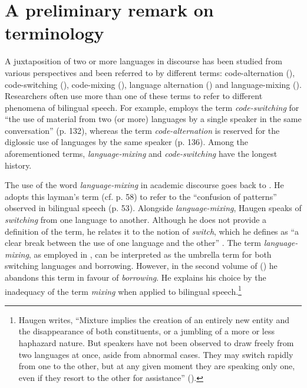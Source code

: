 \section{A preliminary remark on terminology}
\label{sec:preliminary}
A juxtaposition of two or more languages in discourse has been studied from various perspectives and been referred to by different terms: code-alternation (\citealt{ extra-code-copying-1993,johanson-zum-1999, thomason-language-2001,migge-exploring-2013}), code-switching (\citealt{gumperz-social-1972, poplack-sometimes-1980,myers-scotton-duelling-1993,backus-two-1996}), code-mixing (\citealt{muysken-bilingual-2000,muhamedowa-untersuchung-2006}), language alternation (\citealt{auer-bilingual-1984, maschler-transition-1998}) and language-mixing (\citealt{pfaff-1979, backus-patterns-1992,lanza-language-2004}). Researchers often use more than one of these terms to refer to different phenomena of bilingual speech. For example, \citet{thomason-language-2001} employs the term \textit{code-switching}  for ``the use of material from two (or more) languages by a single speaker in the same conversation'' (p. 132), whereas the term \textit{code-alternation} is reserved for the diglossic use of languages by the same speaker (p. 136). Among the aforementioned terms, \textit {language-mixing} and \textit {code-switching} have the longest history. 

The use of the word \textit {language-mixing} in academic discourse goes back to \citet{haugen-1953-vol1}. He adopts this layman's term (cf. p. 58) to refer to the ``confusion of patterns'' observed in bilingual speech (p. 53). Alongside \textit{language-mixing}, Haugen speaks of \textit{switching} from one language to another. Although he does not provide a definition of the term, he relates it to the notion of \textit{switch}, which he defines as ``a clear break between the use of one language and the other'' \citep[65]{haugen-1953-vol1}. The term \textit{language-mixing}, as employed in \citet{haugen-1953-vol1}, can be interpreted as the umbrella term for both switching languages and borrowing. However, in the second volume of  (\citeyear{haugen-1953-vol2}) he abandons this term in favour of \textit{borrowing}. He explains his choice by the inadequacy of the term \textit{mixing} when applied to bilingual speech.\footnote{Haugen writes, ``Mixture implies the creation of an entirely new entity and the disappearance of both constituents, or a jumbling of a more or less haphazard nature. But speakers have not been observed to draw freely from two languages at once, aside from abnormal cases. They may switch rapidly from one to the other, but at any given moment they are speaking only one, even if they resort to the other for assistance'' (\citeyear[362]{haugen-1953-vol2}).}

